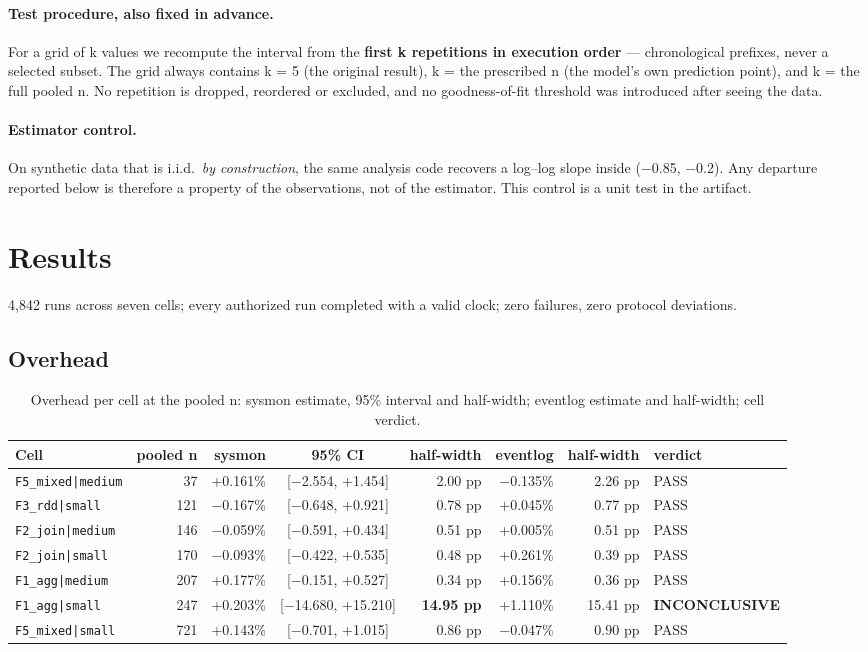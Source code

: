 \documentclass[sigconf,review,anonymous]{acmart}
\newcommand{\cell}[1]{\texttt{#1}}
\begin{document}
\paragraph{Test procedure, also fixed in advance.} For a grid of k values we recompute the interval from
the \textbf{first k repetitions in execution order} --- chronological prefixes, never a selected
subset. The grid always contains k = 5 (the original result), k = the prescribed n (the model's
own prediction point), and k = the full pooled n. No repetition is dropped, reordered or
excluded, and no goodness-of-fit threshold was introduced after seeing the data.

\paragraph{Estimator control.} On synthetic data that is i.i.d.\ \emph{by construction}, the same analysis
code recovers a log--log slope inside (−0.85, −0.2). Any departure reported below is therefore a
property of the observations, not of the estimator. This control is a unit test in the artifact.

\section{Results}\label{sec:results}

4,842 runs across seven cells; every authorized run completed with a valid clock; zero failures,
zero protocol deviations.

\subsection{Overhead}

\begin{table}[t]
\caption{Overhead per cell at the pooled n: sysmon estimate, 95\% interval and half-width; eventlog estimate and half-width; cell verdict.}\label{tab:overhead}
\small
\begin{tabular}{lrrcrrrl}
\toprule
Cell & pooled n & sysmon & 95\% CI & half-width & eventlog & half-width & verdict \\
\midrule
\cell{F5\_mixed|medium} & 37 & +0.161\% & [−2.554, +1.454] & 2.00 pp & −0.135\% & 2.26 pp & PASS \\
\cell{F3\_rdd|small} & 121 & −0.167\% & [−0.648, +0.921] & 0.78 pp & +0.045\% & 0.77 pp & PASS \\
\cell{F2\_join|medium} & 146 & −0.059\% & [−0.591, +0.434] & 0.51 pp & +0.005\% & 0.51 pp & PASS \\
\cell{F2\_join|small} & 170 & −0.093\% & [−0.422, +0.535] & 0.48 pp & +0.261\% & 0.39 pp & PASS \\
\cell{F1\_agg|medium} & 207 & +0.177\% & [−0.151, +0.527] & 0.34 pp & +0.156\% & 0.36 pp & PASS \\
\cell{F1\_agg|small} & 247 & +0.203\% & [−14.680, +15.210] & \textbf{14.95 pp} & +1.110\% & 15.41 pp & \textbf{INCONCLUSIVE} \\
\cell{F5\_mixed|small} & 721 & +0.143\% & [−0.701, +1.015] & 0.86 pp & −0.047\% & 0.90 pp & PASS \\
\bottomrule
\end{tabular}
\end{table}
\end{document}

